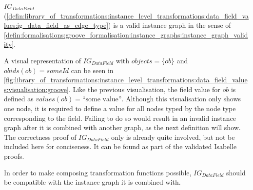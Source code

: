 \begin{thm}
\label{defin:library_of_transformations:instance_level_transformations:data_field_values:ig_data_field_as_edge_type_correct}
$IG_{DataField}$ (\cref{defin:library_of_transformations:instance_level_transformations:data_field_values:ig_data_field_as_edge_type}) is a valid instance graph in the sense of \cref{defin:formalisations:groove_formalisation:instance_graphs:instance_graph_validity}.
\end{thm}

A visual representation of $IG_{DataField}$ with $objects = \{ob\}$ and $obids(ob) = someId$ can be seen in \cref{fig:library_of_transformations:instance_level_transformations:data_field_values:visualisation:groove}. Like the previous visualisation, the field value for $ob$ is defined as $values(ob) = \text{``some value''}$. Although this visualisation only shows one node, it is required to define a value for all nodes typed by the node type corresponding to the field. Failing to do so would result in an invalid instance graph after it is combined with another graph, as the next definition will show. The correctness proof of $IG_{DataField}$ only is already quite involved, but not be included here for conciseness. It can be found as part of the validated Isabelle proofs.

In order to make composing transformation functions possible, $IG_{DataField}$ should be compatible with the instance graph it is combined with.

